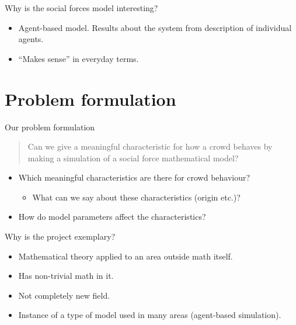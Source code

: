 \documentclass{beamer}
\begin{document}
\begin{frame}{Why is the social forces model interesting?}
    \begin{itemize}
        \item Agent-based model. Results about the system from description of 
            individual agents.
        \item ``Makes sense'' in everyday terms.
    \end{itemize}
\end{frame}

\section{Problem formulation}
\begin{frame}{Our problem formulation}
    \begin{quote}
        Can we give a meaningful characteristic for how a crowd behaves by 
        making a simulation of a social force mathematical model?
    \end{quote}
    \begin{itemize}
        \item Which meaningful characteristics are there for crowd behaviour?
            \begin{itemize}
                \item What can we say about these characteristics (origin 
                    etc.)?
            \end{itemize}
        \item How do model parameters affect the characteristics?
    \end{itemize}
\end{frame}

\begin{frame}{Why is the project exemplary?}
    \begin{itemize}
        \item Mathematical theory applied to an area outside math itself.
        \item Has non-trivial math in it.
        \item Not completely new field.
        \item Instance of a type of model used in many areas (agent-based 
            simulation).
    \end{itemize}
\end{frame}
\end{document}
